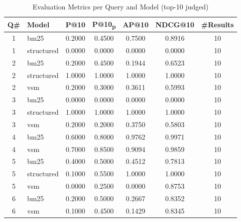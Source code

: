 \begin{table}[t]
\centering
\caption{Evaluation Metrics per Query and Model (top-10 judged)}
\label{tab:eval-metrics}
\begin{tabular}{clccccc}
\toprule
Q\# & Model & P@10 & P@10\textsubscript{p} & AP@10 & NDCG@10 & \#Results \\
\midrule
1 & bm25 & 0.2000 & 0.4500 & 0.7500 & 0.8916 & 10 \\
1 & structured & 0.0000 & 0.0000 & 0.0000 & 0.0000 & 10 \\
\midrule
2 & bm25 & 0.2000 & 0.4500 & 0.1944 & 0.6523 & 10 \\
2 & structured & 1.0000 & 1.0000 & 1.0000 & 1.0000 & 10 \\
2 & vsm & 0.2000 & 0.3000 & 0.3611 & 0.5993 & 10 \\
\midrule
3 & bm25 & 0.0000 & 0.0000 & 0.0000 & 0.0000 & 10 \\
3 & structured & 1.0000 & 1.0000 & 1.0000 & 1.0000 & 10 \\
3 & vsm & 0.2000 & 0.2000 & 0.3750 & 0.5803 & 10 \\
\midrule
4 & bm25 & 0.6000 & 0.8000 & 0.9762 & 0.9971 & 10 \\
4 & vsm & 0.7000 & 0.8500 & 0.9094 & 0.9859 & 10 \\
\midrule
5 & bm25 & 0.4000 & 0.5000 & 0.4512 & 0.7813 & 10 \\
5 & structured & 0.1000 & 0.5500 & 1.0000 & 1.0000 & 10 \\
5 & vsm & 0.0000 & 0.2500 & 0.0000 & 0.8753 & 10 \\
\midrule
6 & bm25 & 0.2000 & 0.5000 & 0.2667 & 0.8352 & 10 \\
6 & vsm & 0.1000 & 0.4500 & 0.1429 & 0.8345 & 10 \\
\bottomrule
\end{tabular}
\end{table}
